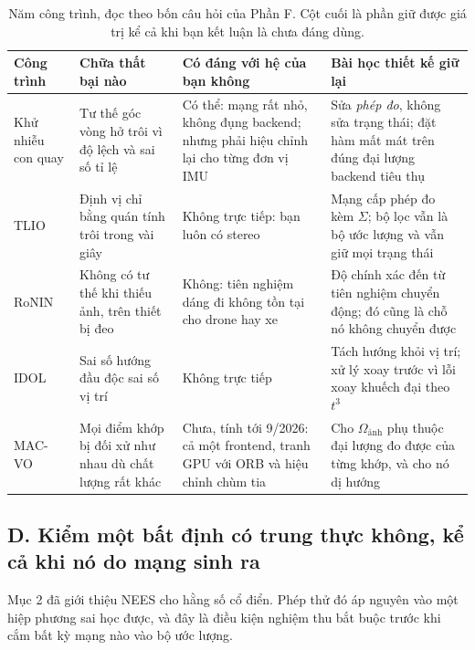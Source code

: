 \documentclass[../../deep_learning.tex]{subfiles}
\begin{document}
\begin{table}[H]\centering\footnotesize
\caption{Năm công trình, đọc theo bốn câu hỏi của Phần F. Cột cuối là phần giữ được giá trị kể cả khi bạn kết luận là chưa đáng dùng.}
\label{tab:f34-bon-cau}
\begin{tabularx}{\linewidth}{@{}L{2.1cm}L{3.5cm}YL{3.6cm}@{}}
\toprule
\textbf{Công trình} & \textbf{Chữa thất bại nào} & \textbf{Có đáng với hệ của bạn không} & \textbf{Bài học thiết kế giữ lại}\\
\midrule
Khử nhiễu con quay & Tư thế góc vòng hở trôi vì độ lệch và sai số tỉ lệ & Có thể: mạng rất nhỏ, không đụng backend; nhưng phải hiệu chỉnh lại cho từng đơn vị IMU & Sửa \emph{phép đo}, không sửa trạng thái; đặt hàm mất mát trên đúng đại lượng backend tiêu thụ\\
TLIO & Định vị chỉ bằng quán tính trôi trong vài giây & Không trực tiếp: bạn luôn có stereo & Mạng cấp phép đo kèm \(\Sigma\); bộ lọc vẫn là bộ ước lượng và vẫn giữ mọi trạng thái\\
RoNIN & Không có tư thế khi thiếu ảnh, trên thiết bị đeo & Không: tiên nghiệm dáng đi không tồn tại cho drone hay xe & Độ chính xác đến từ tiên nghiệm chuyển động; đó cũng là chỗ nó không chuyển được\\
IDOL & Sai số hướng đầu độc sai số vị trí & Không trực tiếp & Tách hướng khỏi vị trí; xử lý xoay trước vì lỗi xoay khuếch đại theo \(t^3\)\\
MAC-VO & Mọi điểm khớp bị đối xử như nhau dù chất lượng rất khác & Chưa, tính tới 9/2026: cả một frontend, tranh GPU với ORB và hiệu chỉnh chùm tia & Cho \(\Omega_{\text{ảnh}}\) phụ thuộc đại lượng đo được của từng khớp, và cho nó dị hướng\\
\bottomrule
\end{tabularx}
\end{table}


\subsection{D. Kiểm một bất định có trung thực không, kể cả khi nó do mạng sinh ra}

Mục 2 đã giới thiệu NEES cho hằng số cổ điển. Phép thử đó áp nguyên vào một hiệp phương sai học được, và đây là điều kiện nghiệm thu bắt buộc trước khi cắm bất kỳ mạng nào vào bộ ước lượng.
\end{document}
